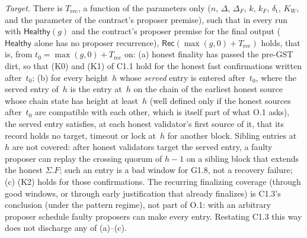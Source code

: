 \documentclass{article}
\begin{document}
\emph{Target.}  There is $T_{\mathrm{rec}}$, a function of the parameters
only ($n$, $\Delta$, $\Delta_F$, $k$, $k_F$, $\delta_{\mathrm t}$, $K_W$, and the
parameter of the contract's proposer premise),
such that in every run with $\mathsf{Healthy}(g)$ and the contract's proposer
premise for the final output ($\mathsf{Healthy}$ alone has no proposer
recurrence), $\mathsf{Rec}(\max(g,0)+T_{\mathrm{rec}})$ holds, that is, from
$t_0=\max(g,0)+T_{\mathrm{rec}}$ on: (a) honest finality has passed the
pre-GST dirt, so that (K0) and (K1) of C1.1 hold for the honest fast
confirmations written after~$t_0$; (b) for every height~$h$ whose
\emph{served} entry is entered after~$t_0$, where the served entry of~$h$ is
the entry at~$h$ on the chain of the earliest honest source whose chain state
has height at least~$h$ (well defined only if the honest sources after~$t_0$
are compatible with each other, which is itself part of what O.1 asks), the
served entry satisfies, at each honest
validator's first source of it, that its record holds no target, timeout or
lock at~$h$ for another block.  Sibling entries at~$h$ are not covered: after
honest validators target the served entry, a faulty proposer can replay the
crossing quorum of $h-1$ on a sibling block that extends the honest
$\Sigma.F$; such an entry is a bad window for G1.8, not a recovery failure; (c) (K2) holds for those confirmations.  The
recurring finalizing coverage (through good windows, or through early
justification that already finalizes) is C1.3's conclusion (under the pattern
regime), not part of O.1: with an arbitrary proposer schedule faulty proposers can make
every entry.  Restating C1.3 this way does not
discharge any of (a)--(c).
\end{document}

